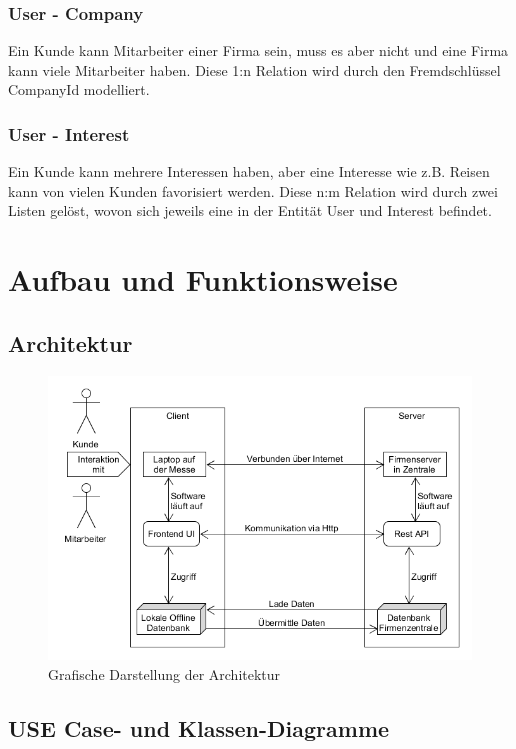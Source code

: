 \subsubsection{User - Company}
Ein Kunde kann Mitarbeiter einer Firma sein, muss es aber nicht und eine Firma kann viele Mitarbeiter haben. Diese 1:n Relation wird durch den Fremdschlüssel CompanyId modelliert.

\subsubsection{User - Interest}
Ein Kunde kann mehrere Interessen haben, aber eine Interesse wie z.B. Reisen kann von vielen Kunden favorisiert werden. Diese n:m Relation wird durch zwei Listen gelöst, wovon sich jeweils eine in der Entität User und Interest befindet.

\newpage
\section{Aufbau und Funktionsweise}

\subsection{Architektur}
\begin{figure}[h]
	\centering
	\includegraphics[width=0.8\linewidth]{Images/Projekt_Messe_Architektur}
	\caption{Grafische Darstellung der Architektur}
	\label{fig:projektmessearchitektur}
\end{figure}

\newpage
\subsection{USE Case- und Klassen-Diagramme}

